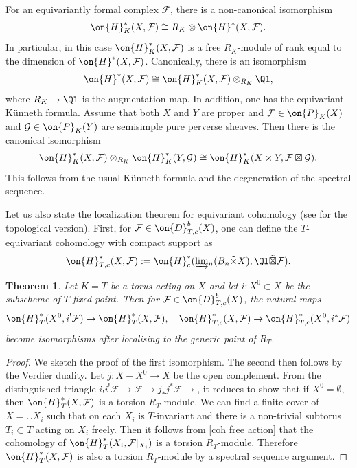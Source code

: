 \documentclass[]{pcmi}
\theoremstyle{plain}
\newtheorem{thm}[equation]{Theorem}
\theoremstyle{remark}
\theoremstyle{definition}
\newcommand{\mF}{{\mathcal F}}
\newcommand{\mG}{{\mathcal G}}
\begin{document}
For an equivariantly formal complex $\mF$, there is a non-canonical isomorphism $$\on{H}^*_K(X,\mF)\cong R_{K}\otimes\on{H}^*(X,\mF).$$ In particular, in this case $\on{H}^*_K(X,\mF)$ is a free $R_{K}$-module of rank equal to the dimension of $\on{H}^*(X,\mF)$. Canonically, there is an isomorphism
\begin{equation}\label{de-equiv}
\on{H}^*(X,\mF)\cong \on{H}^*_K(X,\mF)\otimes_{R_{K}}\Ql,
\end{equation}
where $R_{K}\to\Ql$ is the augmentation map. In addition, one has the equivariant K\"unneth formula. Assume that both $X$ and $Y$ are proper and $\mF\in\on{P}_K(X)$ and $\mG\in\on{P}_K(Y)$ are semisimple pure perverse sheaves. Then there is the canonical isomorphism
\begin{equation}\label{equiv Kunneth}
\on{H}_K^*(X,\mF)\otimes_{R_{K}}\on{H}_K^*(Y,\mG)\cong \on{H}^*_K(X\times Y,\mF\boxtimes\mG).
\end{equation}
This follows from the usual K\"unneth formula and the degeneration of the spectral sequence.

Let us also state the localization theorem for equivariant cohomology (see \cite[(6.2)]{GKM} for the topological version). First, for $\mF\in \on{D}_{T,c}^b(X)$, one can define the $T$-equivariant cohomology with compact support as 
$$\on{H}_{T,c}^*(X,\mF):=\on{H}_c^*(\underrightarrow\lim_n (B_n\tilde\times X), \Ql\tilde\boxtimes \mF).$$

\begin{thm}\label{equiv localization}
Let $K=T$ be a torus acting on $X$ and let $i:X^0\subset X$ be the subscheme of $T$-fixed point. Then for $\mF\in\on{D}_{T,c}^b(X)$, the natural maps
\[\on{H}^*_T(X^0,i^!\mF)\to \on{H}^*_T(X,\mF),\quad \on{H}^*_{T,c}(X,\mF)\to \on{H}^*_{T,c}(X^0,i^*\mF)\]
become isomorphisms after localising to the generic point of $R_{T}$.
\end{thm}
\begin{proof}We sketch the proof of the first isomorphism. The second then follows by the Verdier duality. Let $j: X-X^0\to X$ be the open complement. From the distinguished triangle $i_!i^!\mF\to \mF\to j_*j^*\mF\to$, it reduces to show that if $X^0=\emptyset$, then $\on{H}^*_T(X,\mF)$ is a torsion $R_T$-module. We can find a finite cover of $X=\cup X_i$ such that on each $X_i$ is $T$-invariant and there is a non-trivial subtorus $T_i\subset T$ acting on $X_i$ freely. Then it follows from \eqref{coh free action} that the cohomology of $\on{H}^*_T(X_i,\mF|_{X_i})$ is a torsion $R_T$-module. Therefore $\on{H}^*_T(X,\mF)$ is also a torsion $R_T$-module by a spectral sequence argument.
\end{proof}
\end{document}
